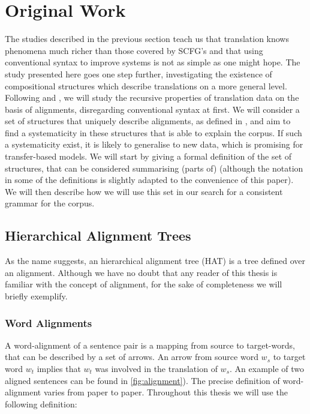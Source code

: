 \documentclass{report}
\theoremstyle{definition}
\theoremstyle{plain}
\begin{document}
\section{Original Work}

The studies described in the previous section teach us that translation knows phenomena much richer than those covered by SCFG's and that using conventional syntax to improve systems is not as simple as one might hope. The study presented here goes one step further, investigating the existence of compositional structures which describe translations on a more general level. Following \cite{wu1997stochastic} and \cite{wellington2006empirical}, we will study the recursive properties of translation data on the basis of alignments, disregarding conventional syntax at first.  We will consider a set of structures that uniquely describe alignments, as defined in \cite{simaan2013hats}, and aim to find a systematicity in these structures that is able to explain the corpus. If such a systematicity exist, it is likely to generalise to new data, which is promising for transfer-based models. We will start by giving a formal definition of the set of structures, that can be considered summarising (parts of) \cite{simaan2013hats} (although the notation in some of the definitions is slightly adapted to the convenience of this paper). We will then describe how we will use this set in our search for a consistent grammar for the corpus.


\subsection{Hierarchical Alignment Trees}

As the name suggests, an hierarchical alignment tree (HAT) is a tree defined over an alignment. Although we have no doubt that any reader of this thesis is familiar with the concept of alignment, for the sake of completeness we will briefly exemplify.

\subsubsection{Word Alignments} A word-alignment of a sentence pair is a mapping from source to target-words, that can be described by a set of arrows. An arrow from source word $w_s$ to target word $w_t$ implies that $w_t$ was involved in the translation of $w_s$. An example of two aligned sentences can be found in \ref{fig:alignment}). The precise definition of word-alignment varies from paper to paper. Throughout this thesis we will use the following definition:
\end{document}
